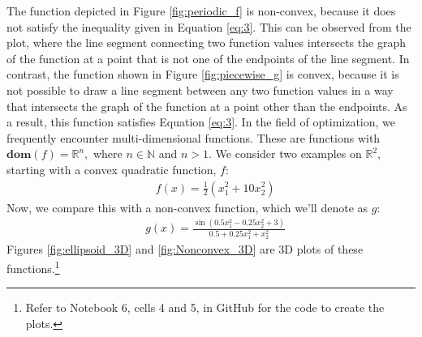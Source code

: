 The function depicted in Figure \ref{fig:periodic_f} is non-convex, because it does not satisfy the inequality given in Equation \eqref{eq:3}. This can be observed from the plot, where the line segment connecting two function values intersects the graph of the function at a point that is not one of the endpoints of the line segment. In contrast, the function shown in Figure \ref{fig:piecewise_g} is convex, because it is not possible to draw a line segment between any two function values in a way that intersects the graph of the function at a point other than the endpoints. As a result, this function satisfies Equation \eqref{eq:3}.
In the field of optimization, we frequently encounter multi-dimensional functions. These are functions with $\textbf{dom} (f)=\mathbb{R}^{n},$ where $n\in\mathbb{N}$ and $n > 1$. We consider two examples on $\mathbb{R}^2$, starting with a convex quadratic function, $f$:
\begin{equation*}\label{eq:10}\tag{2.5}
\begin{aligned}
&f(x) = \frac{1}{2}(x_{1}^{2} + 10x_{2}^{2})
\end{aligned}
\end{equation*}
Now, we compare this with a non-convex function, which we'll denote as $g$:
\begin{equation*}\label{eq:11}\tag{2.6}
\begin{aligned}
&g(x) = \frac{\sin\left(0.5x_1^2 - 0.25x_2^2 + 3\right)}{0.5 + 0.25x_1^2 + x_2^2}
\end{aligned}
\end{equation*}
Figures \ref{fig:ellipsoid_3D} and \ref{fig:Nonconvex_3D} are 3D plots of these functions.\footnote{Refer to Notebook 6, cells 4 and 5, in GitHub \cite{ThesisCode2023} for the code to create the plots.}
